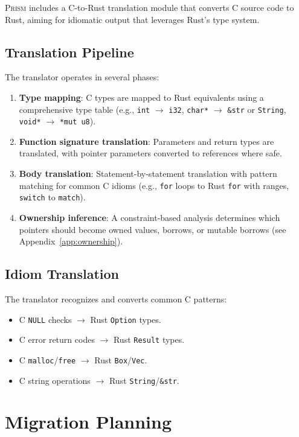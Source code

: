 \documentclass[11pt,a4paper]{article}
\begin{document}
\textsc{Prism} includes a C-to-Rust translation module that converts
C source code to Rust, aiming for idiomatic output that leverages
Rust's type system.

\subsection{Translation Pipeline}

The translator operates in several phases:
\begin{enumerate}
  \item \textbf{Type mapping}: C types are mapped to Rust equivalents
    using a comprehensive type table (e.g., \texttt{int} $\to$
    \texttt{i32}, \texttt{char*} $\to$ \texttt{\&str} or
    \texttt{String}, \texttt{void*} $\to$ \texttt{*mut u8}).
  \item \textbf{Function signature translation}: Parameters and return
    types are translated, with pointer parameters converted to
    references where safe.
  \item \textbf{Body translation}: Statement-by-statement translation
    with pattern matching for common C idioms
    (e.g., \texttt{for} loops to Rust \texttt{for} with ranges,
    \texttt{switch} to \texttt{match}).
  \item \textbf{Ownership inference}: A constraint-based analysis
    determines which pointers should become owned values, borrows,
    or mutable borrows (see Appendix~\ref{app:ownership}).
\end{enumerate}

\subsection{Idiom Translation}

The translator recognizes and converts common C patterns:
\begin{itemize}
  \item C \texttt{NULL} checks $\to$ Rust \texttt{Option} types.
  \item C error return codes $\to$ Rust \texttt{Result} types.
  \item C \texttt{malloc}/\texttt{free} $\to$ Rust \texttt{Box}/\texttt{Vec}.
  \item C string operations $\to$ Rust \texttt{String}/\texttt{\&str}.
\end{itemize}


\section{Migration Planning}\label{sec:migration}
\end{document}
